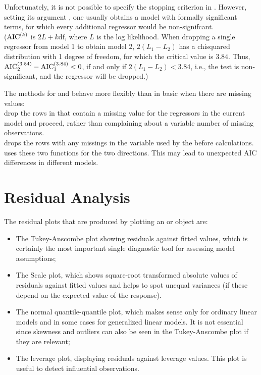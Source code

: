 \documentclass[11pt]{article}\usepackage[]{graphicx}\usepackage[]{color}
\begin{document}
Unfortunately, it is not possible to specify the stopping criterion 
in . However, setting its argument , 
one usually obtains a model with formally significant terms, for which
every additional regressor would be non-signifcant.
\\
($\mbox{AIC}^{(k)}$ is $2L+k\mbox{df}$, where $L$ is the log likelihood.
When dropping a single regressor from model 1 to obtain model 2,
$2(L_1-L_2)$ has a chisquared distribution with 1 degree of freedom,
for which the critical value is $3.84$.
Thus, $\mbox{AIC}_2^{(3.84)}-\mbox{AIC}_1^{(3.84)}<0$,
if and only if $2(L_1-L_2)<3.84$, i.e., the test is non-significant, 
and the regressor will be dropped.)

The  methods for  and  behave more flexibly than
in basic  when there are missing values: \\
 drop the rows in 
 that contain a missing value for the regressors in the current
model and proceed, rather than complaining about a variable number of
missing observations.\\
 drops the rows with any missings in the variable used by the
 before calculations.\\
 uses these two functions for the two directions.
This may lead to unexpected AIC differences in different models.

\Vneed{50mm}
\section{Residual Analysis}
The residual plots that are produced by plotting an  or 
object are: 
\begin{itemize}
\item 
The Tukey-Anscombe plot showing residuals against fitted values,
which is certainly the most important single diagnostic tool for assessing
model assumptions;
\item
The Scale plot, which shows square-root transformed absolute values of
residuals against 
fitted values and helps to spot unequal variances (if these depend on the
expected value of the response).
\item
The normal quantile-quantile plot, which makes sense only for ordinary
linear models and in some cases for generalized linear models. 
It is not essential since skewness and outliers can also be seen in the
Tukey-Anscombe plot if they are relevant;
\item
The leverage plot, displaying residuals against leverage values.
This plot is useful to detect influential observations.
\end{itemize}
\end{document}
